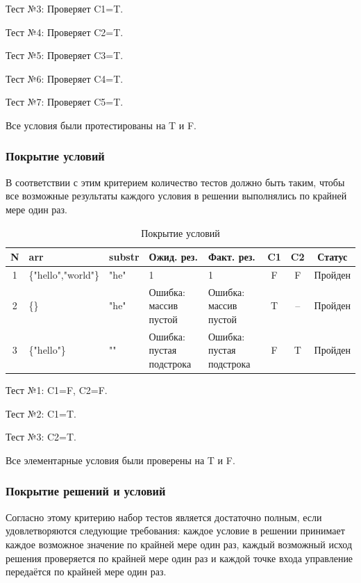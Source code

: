 \documentclass{article}[14pt]
\begin{document}
Тест №3: Проверяет C1=T.

Тест №4: Проверяет C2=T.

Тест №5: Проверяет C3=T.

Тест №6: Проверяет C4=T.

Тест №7: Проверяет C5=T.

Все условия были протестированы на T и F.

\subsubsection{Покрытие условий}

В соответствии с этим критерием количество тестов должно быть таким, чтобы
все возможные результаты каждого условия в решении выполнялись по крайней мере
один раз.

\begin{table}[h!]
\centering
\caption{Покрытие условий}
\begin{tabularx}{\textwidth}{|c|X|X|X|X|c|c|c|}
\hline
\textbf{N} & \textbf{arr} & \textbf{substr} & \textbf{Ожид. рез.} & \textbf{Факт. рез.} & \textbf{C1} & \textbf{C2} & \textbf{Статус} \\
\hline
1 & \{"hello","world"\} & "he" & 1 & 1 & F & F & Пройден \\
\hline
2 & \{\} & "he" & Ошибка: массив пустой & Ошибка: массив пустой & T & -- & Пройден \\
\hline
3 & \{"hello"\} & "" & Ошибка: пустая подстрока & Ошибка: пустая подстрока & F & T & Пройден \\
\hline
\end{tabularx}
\end{table}

Тест №1: C1=F, C2=F.

Тест №2: C1=T.

Тест №3: C2=T.

Все элементарные условия были проверены на T и F.

\subsubsection{Покрытие решений и условий}

Согласно этому критерию набор тестов является достаточно полным, если удовлетворяются следующие требования: каждое условие в решении принимает каждое
возможное значение по крайней мере один раз, каждый возможный исход решения
проверяется по крайней мере один раз и каждой точке входа управление передаётся
по крайней мере один раз.
\end{document}
